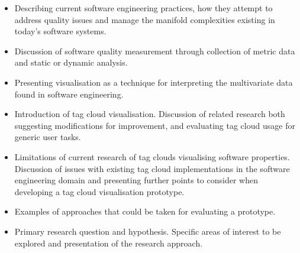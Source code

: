 \begin{itemize}
	\item Describing current software engineering practices, how they attempt to address quality issues and manage the manifold complexities existing in today's software systems.
	\item Discussion of software quality measurement through collection of metric data and static or dynamic analysis. 
	\item Presenting visualisation as a technique for interpreting the multivariate data found in software engineering.
	\item Introduction of tag cloud visualisation. Discussion of related research both suggesting modifications for improvement, and evaluating tag cloud usage for generic user tasks. 
	\item Limitations of current research of tag clouds visualising software properties. Discussion of issues with existing tag cloud implementations in the software engineering domain and presenting further points to consider when developing a tag cloud visualisation prototype.
	\item Examples of approaches that could be taken for evaluating a prototype.	
	\item Primary research question and hypothesis. Specific areas of interest to be explored and presentation of the research approach.
\end{itemize}



